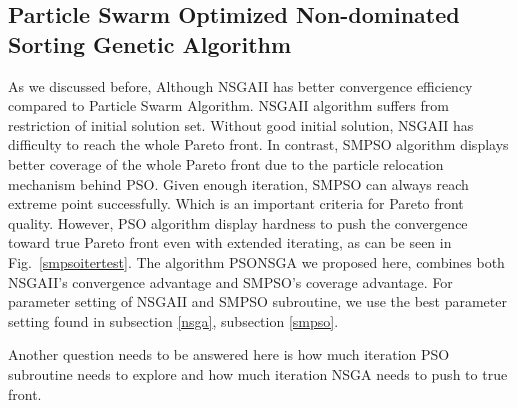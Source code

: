 \documentclass[10pt,journal,compsoc]{IEEEtran}
\newcommand{\Fig}[1]{Fig.~\ref{#1}}
\begin{document}
\subsection{Particle Swarm Optimized Non-dominated Sorting Genetic Algorithm}\label{psonsga}
As we discussed before, Although NSGAII has better convergence efficiency compared to Particle Swarm Algorithm. NSGAII algorithm suffers from restriction of initial solution set. Without good initial solution, NSGAII has difficulty to reach the whole Pareto front. In contrast, SMPSO algorithm displays better coverage of the whole Pareto front due to the particle relocation mechanism behind PSO. Given enough iteration, SMPSO can always reach extreme point successfully. Which is an important criteria for Pareto front quality. However, PSO algorithm display hardness to push the convergence toward true Pareto front even with extended iterating, as can be seen in \Fig{smpsoitertest}.
The algorithm PSONSGA we proposed here, combines both NSGAII's convergence advantage and SMPSO's coverage advantage. 
For parameter setting of NSGAII and SMPSO subroutine, we use the best parameter setting found in subsection \ref{nsga}, subsection \ref{smpso}.
\begin{table}[H]
\caption{PSONSGA Parameter Selection}
\label{psonsgaparatable}
\centering
{}
\end{table}
Another question needs to be answered here is how much iteration PSO subroutine needs to explore and how much iteration NSGA needs to push to true front. 
\end{document}
